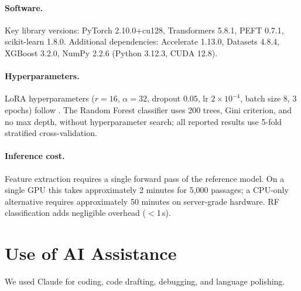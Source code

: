 \paragraph{Software.}
Key library versions: PyTorch 2.10.0+cu128, Transformers 5.8.1, PEFT 0.7.1, scikit-learn 1.8.0.
Additional dependencies: Accelerate 1.13.0, Datasets 4.8.4, XGBoost 3.2.0, NumPy 2.2.6 (Python 3.12.3, CUDA 12.8).

\paragraph{Hyperparameters.}
LoRA hyperparameters ($r{=}16$, $\alpha{=}32$, dropout $0.05$, lr $2{\times}10^{-4}$, batch size 8, 3 epochs) follow \citet{hu2022lora}.
The Random Forest classifier uses 200 trees, Gini criterion, and no max depth, without hyperparameter search; all reported results use 5-fold stratified cross-validation.

\paragraph{Inference cost.}
Feature extraction requires a single forward pass of the reference model.
On a single GPU this takes approximately 2 minutes for 5{,}000 passages; a CPU-only alternative requires approximately 50 minutes on server-grade hardware.
RF classification adds negligible overhead ($<$1\,s).

\section{Use of AI Assistance}
We used Claude for coding, code drafting, debugging, and language polishing.
